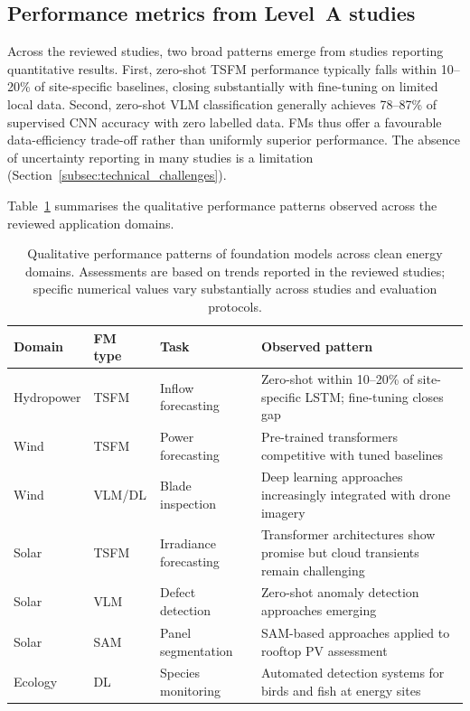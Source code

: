 \documentclass[preprint,12pt]{elsarticle}
\begin{document}
\subsection{Performance metrics from Level~A studies}
\label{subsec:performance_summary}

Across the reviewed studies, two broad patterns emerge from studies reporting quantitative results. First, zero-shot TSFM performance typically falls within 10--20\% of site-specific baselines, closing substantially with fine-tuning on limited local data. Second, zero-shot VLM classification generally achieves 78--87\% of supervised CNN accuracy with zero labelled data. FMs thus offer a favourable data-efficiency trade-off rather than uniformly superior performance. The absence of uncertainty reporting in many studies is a limitation (Section~\ref{subsec:technical_challenges}).

Table~\ref{tab:performance_summary} summarises the qualitative performance patterns observed across the reviewed application domains.

\begin{table}[htbp]
\centering
\caption{Qualitative performance patterns of foundation models across clean energy domains. Assessments are based on trends reported in the reviewed studies; specific numerical values vary substantially across studies and evaluation protocols.}
\label{tab:performance_summary}
\small
\begin{tabular}{@{}p{2.0cm}p{2.5cm}p{2.5cm}p{5.5cm}@{}}
\toprule
\textbf{Domain} & \textbf{FM type} & \textbf{Task} & \textbf{Observed pattern} \\
\midrule
Hydropower & TSFM & Inflow forecasting & Zero-shot within 10--20\% of site-specific LSTM; fine-tuning closes gap \cite{liu2024transformer_hydrologic, zhang2024crossregion_streamflow} \\
Wind & TSFM & Power forecasting & Pre-trained transformers competitive with tuned baselines \cite{lai2024bert4st, mo2024powerformer} \\
Wind & VLM/DL & Blade inspection & Deep learning approaches increasingly integrated with drone imagery \cite{memari2024blade_inspection_review, sheiati2024blade_identification} \\
Solar & TSFM & Irradiance forecasting & Transformer architectures show promise but cloud transients remain challenging \cite{piantadosi2024tsfm_solar_forecast} \\
Solar & VLM & Defect detection & Zero-shot anomaly detection approaches emerging \cite{zhou2024anomalyclip, thakfan2024solar_panel_defect} \\
Solar & SAM & Panel segmentation & SAM-based approaches applied to rooftop PV assessment \cite{li2024sam_solar_panel} \\
Ecology & DL & Species monitoring & Automated detection systems for birds and fish at energy sites \cite{ballester2024bird_detection_wind, saleh2024dl_fish_habitat} \\
\bottomrule
\end{tabular}
\end{table}
\end{document}

